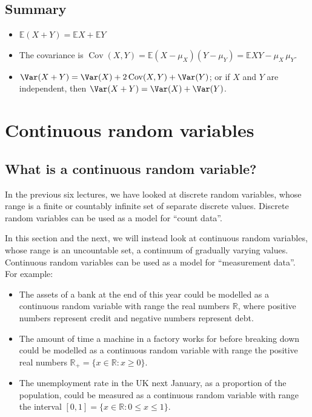 \documentclass[
  letterpaper,
]{report}
\providecommand{\tightlist}{%
  \setlength{\itemsep}{0pt}\setlength{\parskip}{0pt}}\usepackage{longtable,booktabs,array}
\theoremstyle{definition}
\theoremstyle{definition}
\theoremstyle{remark}
\begin{document}
\hypertarget{summary-L14}{%
\section*{Summary}\label{summary-L14}}


\begin{itemize}
\tightlist
\item
  \(\mathbb E(X + Y) = \mathbb EX + \mathbb EY\)
\item
  The covariance is
  \(\operatorname{Cov}(X,Y) = \mathbb E(X - \mu_X)(Y - \mu_Y) = \mathbb EXY - \mu_X \,\mu_Y\).
\item
  \(\Var(X + Y) = \Var(X) + 2\operatorname{Cov}(X,Y) + \Var(Y)\); or if
  \(X\) and \(Y\) are independent, then
  \(\Var(X + Y) = \Var(X) + \Var(Y)\).
\end{itemize}

\hypertarget{L15-continuous}{%
\chapter{Continuous random variables}\label{L15-continuous}}

\hypertarget{continuous-rv}{%
\section{What is a continuous random variable?}\label{continuous-rv}}

In the previous six lectures, we have looked at discrete random
variables, whose range is a finite or countably infinite set of separate
discrete values. Discrete random variables can be used as a model for
``count data''.

In this section and the next, we will instead look at continuous random
variables, whose range is an uncountable set, a continuum of gradually
varying values. Continuous random variables can be used as a model for
``measurement data''. For example:

\begin{itemize}
\tightlist
\item
  The assets of a bank at the end of this year could be modelled as a
  continuous random variable with range the real numbers \(\mathbb R\),
  where positive numbers represent credit and negative numbers represent
  debt.
\item
  The amount of time a machine in a factory works for before breaking
  down could be modelled as a continuous random variable with range the
  positive real numbers
  \(\mathbb R_+ = \{x \in \mathbb R : x \geq 0\}\).
\item
  The unemployment rate in the UK next January, as a proportion of the
  population, could be measured as a continuous random variable with
  range the interval \([0, 1] = \{x \in \mathbb R : 0 \leq x \leq 1\}\).
\end{itemize}
\end{document}
